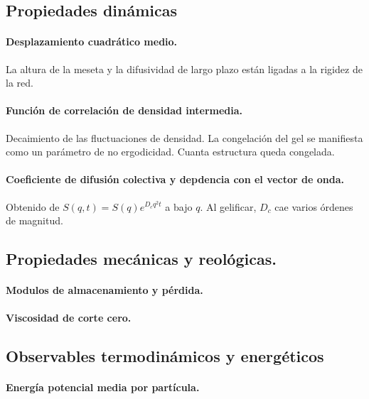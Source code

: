 \documentclass[../main.tex]{subfiles}
\begin{document}
\subsection{Propiedades dinámicas}

\paragraph{Desplazamiento cuadrático medio.}
La altura de la meseta y la difusividad de largo plazo están ligadas a la rigidez de la red.

\paragraph{Función de correlación de densidad intermedia.}
Decaimiento de las fluctuaciones de densidad.
La congelación del gel se manifiesta como un parámetro de no ergodicidad.
Cuanta estructura queda congelada.

\paragraph{Coeficiente de difusión colectiva y depdencia con el vector de onda.}
Obtenido de \(S(q,t)=S(q)e^{D_{c}q^2 t}\) a bajo \(q\).
Al gelificar, \(D_c\) cae varios órdenes de magnitud.

\subsection{Propiedades mecánicas y reológicas.}

\paragraph{Modulos de almacenamiento y pérdida.}

\paragraph{Viscosidad de corte cero.}

\subsection{Observables termodinámicos y energéticos}

\paragraph{Energía potencial media por partícula.}
\end{document}
